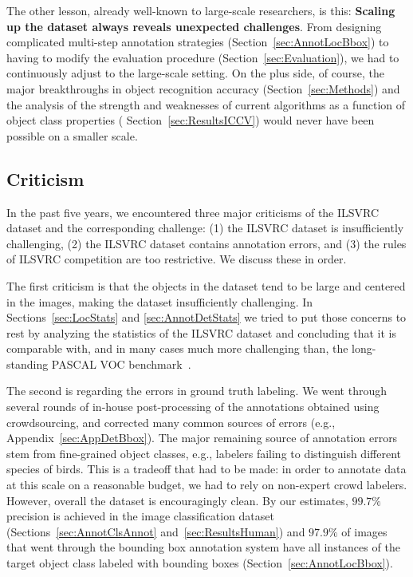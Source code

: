 The other lesson, already well-known to large-scale researchers, is this: {\bf Scaling up the dataset always reveals unexpected challenges}. From designing complicated multi-step annotation strategies (Section~\ref{sec:AnnotLocBbox}) to having to modify the evaluation procedure (Section~\ref{sec:Evaluation}), we had to continuously adjust to the large-scale setting. On the plus side, of course, the major breakthroughs in object recognition accuracy (Section~\ref{sec:Methods}) and the analysis of the strength and weaknesses of current algorithms as a function of object class properties ( Section~\ref{sec:ResultsICCV}) would never have been possible on a smaller scale.

\subsection{Criticism}

In the past five years, we encountered three major criticisms of the ILSVRC dataset and the corresponding challenge: (1) the ILSVRC dataset is insufficiently challenging, (2) the ILSVRC dataset contains annotation errors, and (3) the rules of ILSVRC competition are too restrictive. We discuss these in order.

The first criticism is that the objects in the dataset tend to be large and centered in the images, making the dataset insufficiently challenging. In Sections~\ref{sec:LocStats} and \ref{sec:AnnotDetStats}  we tried to put those concerns to rest by analyzing the statistics of the ILSVRC dataset and concluding that it is comparable with, and in many cases much more challenging than, the long-standing PASCAL VOC benchmark~\citep{PASCALIJCV}.

The second is regarding the errors in ground truth labeling. We went through several rounds of in-house post-processing of the annotations obtained using crowdsourcing, and corrected many common sources of errors (e.g., Appendix~\ref{sec:AppDetBbox}). The major remaining source of annotation errors stem from fine-grained object classes, e.g., labelers failing to distinguish different species of birds. This is a tradeoff that had to be made: in order to annotate data at this scale on a reasonable budget, we had to rely on non-expert crowd labelers. However, overall the dataset is encouragingly clean. By our estimates, $99.7\%$ precision is achieved in the image classification dataset (Sections~\ref{sec:AnnotClsAnnot} and~\ref{sec:ResultsHuman}) and $97.9\%$ of images that went through the bounding box annotation system have all instances of the target object class labeled with bounding boxes (Section~\ref{sec:AnnotLocBbox}).


